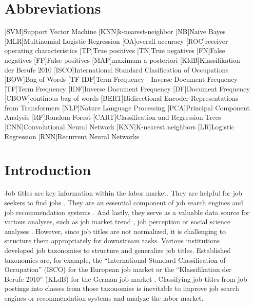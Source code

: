 \documentclass[12pt, a4paper, titlepage]{article}
\begin{document}
\section*{Abbreviations}
\begin{acronym}
  [SVM]{Support Vector Machine}
  [KNN]{k-nearest-neighbor}
  [NB]{Naive Bayes}
  [MLR]{Multinomial Logistic Regression}
  [OA]{overall accuracy}
  [ROC]{receiver operating characteristics}
  [TP]{True positives}
  [TN]{True negatives}
  [FN]{False negatives}
  [FP]{False positives}
  [MAP]{maximum a posteriori}
  [KldB]{Klassifikation der Berufe 2010}
  [ISCO]{International Standard Clasification of Occupations}
  [BOW]{Bag of Words}
  [TF-IDF]{Term Frequency - Inverse Document Frequency}
  [TF]{Term Frequency}
  [IDF]{Inverse Document Frequency}
  [DF]{Document Frequency}
  [CBOW]{continous bag of words}
  [BERT]{Bidirectional Encoder  Representations from Transformers}
  [NLP]{Nature Language Processing}
  [PCA]{Principal Component Analysis}
  [RF]{Random Forest}
  [CART]{Classification and Regression Trees}
  [CNN]{Convolutional Neural Network}
  [KNN]{K-nearest neighbors}
  [LR]{Logistic Regression}
  [RNN]{Recurrent Neural Networks}
\end{acronym}
\newpage

\section{Introduction}
Job titles are key information within the labor market. They are helpful for job seekers to find jobs \citep{marinescu2020}. They are an essential component of job search engines \citep{slamet2018, javed2015, javed2016} and job recommendation systems \citep{malherbe2014}. And lastly, they serve as a valuable data source for various analyses, such as job market trend \citep{martin2021, li2021}, job perception \citep{smith1989, boydston2020} or social science analyses \citep{martin2021}. However, since job titles are not normalized, it is challenging to structure them appropriately for downstream tasks. Various institutions developed job taxonomies to structure and generalize job titles. Established taxonomies are, for example, the ``International Standard Classification of Occupation'' (ISCO) for the European job market or the ``Klassifikation der Berufe 2010'' (KLdB) for the German job market \citep{uter2020}. Classifying job titles from job postings into classes from those taxonomies is inevitable to improve job search engines or recommendation systems and analyze the labor market. 
\end{document}
